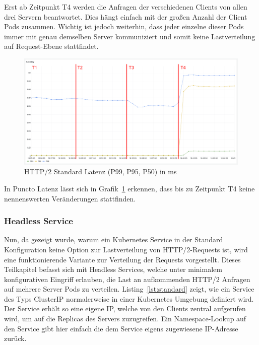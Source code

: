Erst ab Zeitpunkt T4 werden die Anfragen der verschiedenen Clients von allen drei Servern beantwortet.
Dies hängt einfach mit der großen Anzahl der Client Pods zusammen.
Wichtig ist jedoch weiterhin, dass jeder einzelne dieser Pods immer mit genau demselben Server kommuniziert und somit keine Lastverteilung auf Request-Ebene stattfindet.


\begin{figure}[H]
    \centering
    \includegraphics[width=1\textwidth]{img/default_latenz}
    \caption{HTTP/2 Standard Latenz (P99, P95, P50) in ms}
    \label{fig:default_latenz}
\end{figure}

In Puncto Latenz lässt sich in Grafik~\ref{fig:default_latenz} erkennen, dass bis zu Zeitpunkt T4 keine nennenswerten Veränderungen stattfinden.

\subsubsection{Headless Service}\label{subsubsec:headless}

Nun, da gezeigt wurde, warum ein Kubernetes Service in der Standard Konfiguration keine Option zur Lastverteilung von HTTP/2-Requests ist, wird eine funktionierende Variante zur Verteilung der Requests vorgestellt.
Dieses Teilkapitel befasst sich mit Headless Services, welche unter minimalem konfigurativen Eingriff erlauben, die Last an aufkommenden HTTP/2 Anfragen auf mehrere Server Pods zu verteilen.
Listing~\ref{lst:standard} zeigt, wie ein Service des Typs ClusterIP normalerweise in einer Kubernetes Umgebung definiert wird.
Der Service erhält so eine eigene IP, welche von den Clients zentral aufgerufen wird, um auf die Replicas des Servers zuzugreifen.
Ein Namespace-Lookup auf den Service gibt hier einfach die dem Service eigens zugewiesene IP-Adresse zurück.

